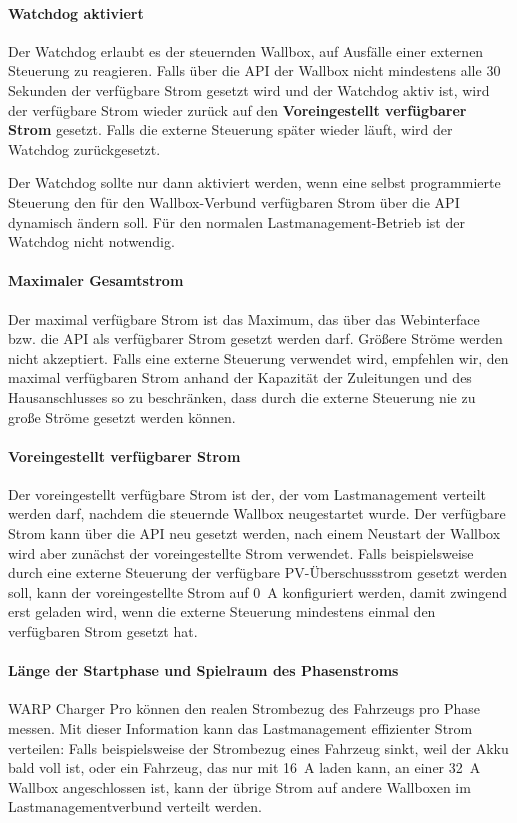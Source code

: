 \documentclass[a4paper,10pt]{article}
\newcommand{\hint}[1]{\begin{tcolorbox}[colback=boxgray,colframe=black,coltext=
white,title=Hinweis,left*=2mm,right*=2mm,boxsep=1mm,bottom=1mm,top=1mm]#1\end{tcolorbox}}
\begin{document}
\begin{multicols*}{2}
    \vspace{-0.2cm}
    \paragraph{Watchdog aktiviert}
    Der Watchdog erlaubt es der steuernden Wallbox, auf Ausfälle einer externen Steuerung zu reagieren. Falls über die API der Wallbox
    nicht mindestens alle 30 Sekunden der verfügbare Strom gesetzt wird und der Watchdog aktiv ist, wird der verfügbare Strom wieder zurück auf den
    \textbf{Voreingestellt verfügbarer Strom} gesetzt. Falls die externe Steuerung später wieder läuft, wird der Watchdog zurückgesetzt.

    \hint{Der Watchdog sollte nur dann aktiviert werden,
    wenn eine selbst programmierte Steuerung den für den Wallbox-Verbund verfügbaren Strom über die API dynamisch ändern soll.
    Für den normalen Lastmanagement-Betrieb ist der Watchdog nicht notwendig.}

    \paragraph{Maximaler Gesamtstrom}
    Der maximal verfügbare Strom ist das Maximum, das über das Webinterface bzw. die API als verfügbarer Strom gesetzt werden darf.
    Größere Ströme werden nicht akzeptiert. Falls eine externe Steuerung verwendet wird, empfehlen wir, den maximal verfügbaren Strom
    anhand der Kapazität der Zuleitungen und des Hausanschlusses so zu beschränken, dass durch die externe Steuerung nie zu große
    Ströme gesetzt werden können.

    \paragraph{Voreingestellt verfügbarer Strom}
    Der voreingestellt verfügbare Strom ist der, der vom Lastmanagement verteilt werden darf, nachdem die steuernde Wallbox
    neugestartet wurde. Der verfügbare Strom kann über die API neu gesetzt werden, nach einem Neustart der Wallbox wird aber
    zunächst der voreingestellte Strom verwendet. Falls beispielsweise durch eine externe Steuerung der verfügbare PV-Überschussstrom
    gesetzt werden soll, kann der voreingestellte Strom auf \SI{0}{\ampere} konfiguriert werden, damit zwingend erst geladen wird,
    wenn die externe Steuerung mindestens einmal den verfügbaren Strom gesetzt
	hat.

    \paragraph{Länge der Startphase und Spielraum des Phasenstroms}
    WARP Charger Pro können den realen Strombezug des Fahrzeugs pro Phase messen.
    Mit dieser Information kann das Lastmanagement effizienter Strom verteilen: Falls beispielsweise
    der Strombezug eines Fahrzeug sinkt, weil der Akku bald voll ist, oder ein Fahrzeug, das nur mit \SI{16}{\ampere}
    laden kann, an einer \SI{32}{\ampere} Wallbox angeschlossen ist, kann der übrige Strom auf andere Wallboxen
    im Lastmanagementverbund verteilt werden.


\end{multicols*}
\end{document}
